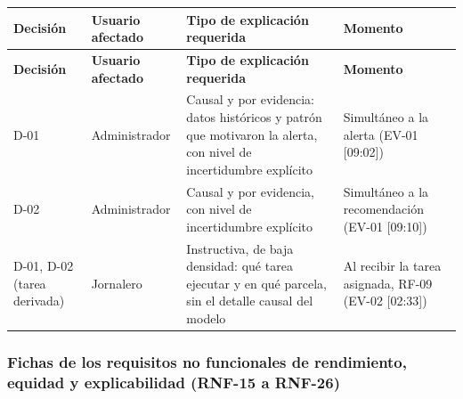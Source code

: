 \documentclass[12pt,a4paper]{article}
\begin{document}
\begin{center}
\begin{longtable}{|p{2cm}|p{2.3cm}|p{5.3cm}|p{3.6cm}|}
\hline
\textbf{Decisión} & \textbf{Usuario afectado} & \textbf{Tipo de explicación requerida} & \textbf{Momento} \\
\hline
\endfirsthead
\hline
\textbf{Decisión} & \textbf{Usuario afectado} & \textbf{Tipo de explicación requerida} & \textbf{Momento} \\
\hline
\endhead
\hline
\endfoot
\hline
\endlastfoot
D-01 & Administrador & Causal y por evidencia: datos históricos y patrón que motivaron la alerta, con nivel de incertidumbre explícito & Simultáneo a la alerta (EV-01 [09:02]) \\
\hline
D-02 & Administrador & Causal y por evidencia, con nivel de incertidumbre explícito & Simultáneo a la recomendación (EV-01 [09:10]) \\
\hline
D-01, D-02 (tarea derivada) & Jornalero & Instructiva, de baja densidad: qué tarea ejecutar y en qué parcela, sin el detalle causal del modelo & Al recibir la tarea asignada, RF-09 (EV-02 [02:33]) \\
\hline
\end{longtable}
\label{tab:necesidades-explicacion}
\end{center}

\subsubsection{Fichas de los requisitos no funcionales de rendimiento, equidad y explicabilidad (RNF-15 a RNF-26)}
\label{sec:ficha-explicabilidad}
\end{document}
